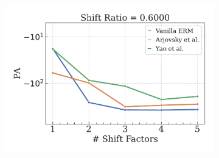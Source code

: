 \begin{figure}[H]
\begin{subfigure}[b]{0.3\textwidth}
        \includegraphics[width=\textwidth]{img/results_discussion/datashift/shift_ratio=0.600.pdf}
    \end{subfigure}

    \vspace{1em}


\end{figure}
